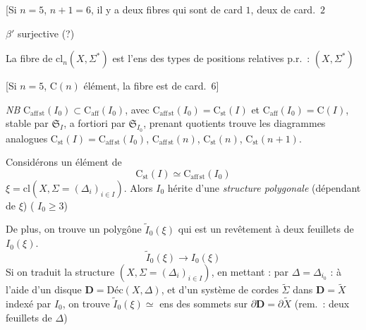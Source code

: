 \documentclass[11pt,a4paper]{article}
\begin{document}
[Si $n = 5$, $n+1 = 6$, il y a deux fibres qui sont de card $1$, deux de card.\ $2$

$\beta'$ surjective (?)

La fibre de $\mathrm{cl}_n(X, \Sigma^{*})$ est l'ens des types de positions relatives p.r.\ : $(X, \Sigma^{*})$

[Si $n = 5$, $\mathrm{C}(n)$  élément, la fibre est de card.\ $6$]

\emph{NB} $\mathrm{C}_{\mathrm{aff}\,\mathrm{st}}(I_0) \subset \mathrm{C}_{\mathrm{aff}}(I_0)$, avec $\mathrm{C}_{\mathrm{aff}\,\mathrm{st}}(I_0) = \mathrm{C}_{\mathrm{st}}(I)$ et $\mathrm{C}_{\mathrm{aff}}(I_0) = \mathrm{C}(I)$,
stable par $\mathfrak{S}_I$, a fortiori par $\mathfrak{S}_{I_0}$, prenant  quotients \ill{} trouve \ill{} les diagrammes analogues \ill{}
$\mathrm{C}_{\mathrm{st}}(I) = \mathrm{C}_{\mathrm{aff}\,\mathrm{st}}(I_0)$, $\mathrm{C}_{\mathrm{aff}\,\mathrm{st}}(n)$, $\mathrm{C}_{\mathrm{st}}(n)$, $\mathrm{C}_{\mathrm{st}}(n+1)$.

Considérons un élément de
\[
\mathrm{C}_{\mathrm{st}}(I) \simeq \mathrm{C}_{\mathrm{aff}\,\mathrm{st}}(I_0)
\]
$\xi = \mathrm{cl}(X, \Sigma = (\Delta_i)_{i \in I})$. Alors $I_0$ hérite d'une \emph{structure polygonale} (dépendant de $\xi$) (\ill{} \ill{}  $I_0 \geqslant 3$)

De plus, on trouve un polygône $\widetilde{I}_0(\xi)$ qui est un revêtement à deux feuillets de $I_0(\xi)$.
\[
\widetilde{I}_0(\xi) \longrightarrow I_0(\xi)
\]
Si on  traduit la structure $(X, \Sigma = (\Delta_i)_{i \in I})$, en mettant : par $\Delta = \Delta_{i_0}$ : à l'aide d'un disque $\mathbf{D} = \mathrm{Déc}(X, \Delta)$,  et d'un système  de cordes $\widetilde{\Sigma}$ dans $\mathbf{D} = \widetilde{X}$ indexé par $I_0$, on trouve 
$\widetilde{I}_0(\xi) \simeq{}$ ens des sommets sur $\partial\mathbf{D} = \partial\widetilde{X}$
(rem.\ : deux feuillets de $\Delta$)
\end{document}
